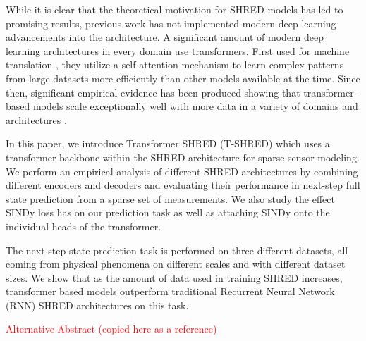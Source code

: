 \documentclass[11pt, a4paper]{article}
\begin{document}
While it is clear that the theoretical motivation for SHRED models has led to promising results, previous work has not implemented modern deep learning advancements into the architecture. A significant amount of modern deep learning architectures in every domain use transformers. First used for machine translation \cite{vaswani2017attention}, they utilize a self-attention mechanism to learn complex patterns from large datasets more efficiently than other models available at the time. Since then, significant empirical evidence has been produced showing that transformer-based models scale exceptionally well with more data in a variety of domains and architectures \cite{Zhai_2022_CVPR, kaplan2020scaling, liang2024scaling}. 

In this paper, we introduce Transformer SHRED (T-SHRED) which uses a transformer backbone within the SHRED architecture for sparse sensor modeling. We perform an empirical analysis of different SHRED architectures by combining different encoders and decoders and evaluating their performance in next-step full state prediction from a sparse set of measurements. We also study the effect SINDy loss \cite{gao2025sparseidentificationnonlineardynamics} has on our prediction task as well as attaching SINDy onto the individual heads of the transformer.

The next-step state prediction task is performed on three different datasets, all coming from physical phenomena on different scales and with different dataset sizes. We show that as the amount of data used in training SHRED increases, transformer based models outperform traditional Recurrent Neural Network (RNN) SHRED architectures on this task.

\noindent
\textcolor{red}{Alternative Abstract (copied here as a reference)}
\end{document}
